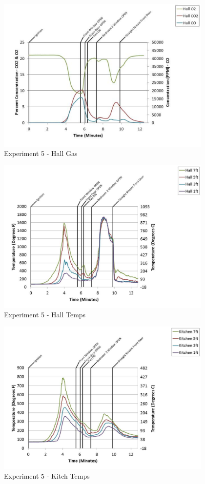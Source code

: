 \documentclass{article}
\begin{document}
\begin{appendices}
	\begin{figure}[h!]
		\centering
		\includegraphics[height=3.05in]{0_Images/Results_Charts/Exp_5_Charts/HallGas.pdf}
		\caption{Experiment 5 - Hall Gas}
	\end{figure}
 
	\clearpage

	\begin{figure}[h!]
		\centering
		\includegraphics[height=3.05in]{0_Images/Results_Charts/Exp_5_Charts/HallTemps.pdf}
		\caption{Experiment 5 - Hall Temps}
	\end{figure}
 

	\begin{figure}[h!]
		\centering
		\includegraphics[height=3.05in]{0_Images/Results_Charts/Exp_5_Charts/KitchTemps.pdf}
		\caption{Experiment 5 - Kitch Temps}
	\end{figure}
 

\end{appendices}
\end{document}
